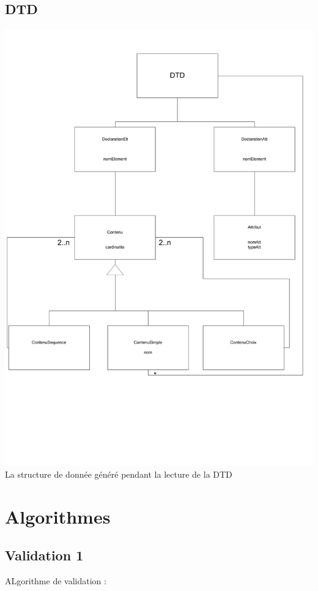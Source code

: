    \subsection{DTD}
        \includegraphics[width=\textwidth]{img/ClassesDTD.pdf}\\
        La structure de donnée généré pendant la lecture de la DTD
        
\section{Algorithmes}

    \subsection{Validation 1} 
	
	ALgorithme de validation :
	
